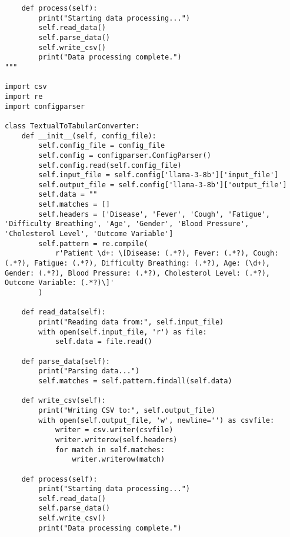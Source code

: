 \begin{verbatim}
    def process(self):
        print("Starting data processing...")
        self.read_data()
        self.parse_data()
        self.write_csv()
        print("Data processing complete.")
"""

import csv
import re
import configparser

class TextualToTabularConverter:
    def __init__(self, config_file):
        self.config_file = config_file
        self.config = configparser.ConfigParser()
        self.config.read(self.config_file)
        self.input_file = self.config['llama-3-8b']['input_file']
        self.output_file = self.config['llama-3-8b']['output_file']
        self.data = ""
        self.matches = []
        self.headers = ['Disease', 'Fever', 'Cough', 'Fatigue', 'Difficulty Breathing', 'Age', 'Gender', 'Blood Pressure', 'Cholesterol Level', 'Outcome Variable']
        self.pattern = re.compile(
            r'Patient \d+: \[Disease: (.*?), Fever: (.*?), Cough: (.*?), Fatigue: (.*?), Difficulty Breathing: (.*?), Age: (\d+), Gender: (.*?), Blood Pressure: (.*?), Cholesterol Level: (.*?), Outcome Variable: (.*?)\]'
        )

    def read_data(self):
        print("Reading data from:", self.input_file)
        with open(self.input_file, 'r') as file:
            self.data = file.read()

    def parse_data(self):
        print("Parsing data...")
        self.matches = self.pattern.findall(self.data)

    def write_csv(self):
        print("Writing CSV to:", self.output_file)
        with open(self.output_file, 'w', newline='') as csvfile:
            writer = csv.writer(csvfile)
            writer.writerow(self.headers)
            for match in self.matches:
                writer.writerow(match)

    def process(self):
        print("Starting data processing...")
        self.read_data()
        self.parse_data()
        self.write_csv()
        print("Data processing complete.")

\end{verbatim}

